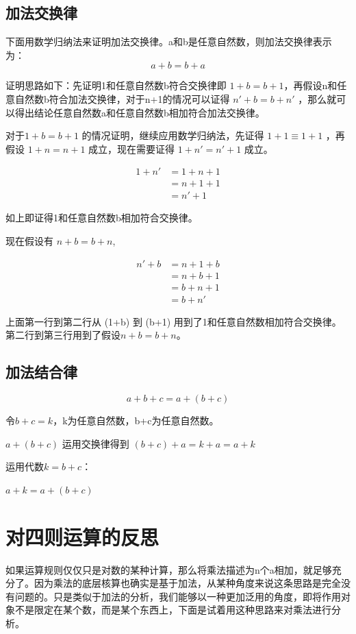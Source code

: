 \documentclass[12pt,oneside]{book}
\begin{document}
\subsection{加法交换律}
下面用数学归纳法来证明加法交换律。a和b是任意自然数，则加法交换律表示为：
\begin{equation}
a+b=b+a
\end{equation}

证明思路如下：先证明1和任意自然数b符合交换律即 $1+b = b+1$，再假设n和任意自然数b符合加法交换律，对于n+1的情况可以证得 $n'+b=b+n'$ ，那么就可以得出结论任意自然数a和任意自然数b相加符合加法交换律。

对于$1+b=b+1$ 的情况证明，继续应用数学归纳法，先证得 $1+1\equiv 1+1$ ，再假设 $1+n=n+1$ 成立，现在需要证得 $1+n'=n'+1$ 成立。

\begin{align}
1+n' &= 1+n+1\\
        &= n+1+1 \\
        &=n'+1
\end{align}

如上即证得1和任意自然数b相加符合交换律。

现在假设有 $n+b=b+n$,

\begin{align}
n'+b &=n+1+b\\
        &=n+b+1\\
        &=b+n+1\\
        &=b+n'
\end{align}

上面第一行到第二行从 (1+b) 到 (b+1) 用到了1和任意自然数相加符合交换律。第二行到第三行用到了假设$n+b=b+n$。

\subsection{加法结合律}
\begin{equation}
a + b + c = a + (b + c)
\end{equation}

令$b+c=k$，k为任意自然数，b+c为任意自然数。

$a+ (b + c)$ 运用交换律得到 $(b+c) +a = k+a = a+k$

运用代数$k=b+c$：

$a+k = a+ (b+c)$


\section{对四则运算的反思}
如果运算规则仅仅只是对数的某种计算，那么将乘法描述为n个a相加，就足够充分了。因为乘法的底层核算也确实是基于加法，从某种角度来说这条思路是完全没有问题的。只是类似于加法的分析，我们能够以一种更加泛用的角度，即将作用对象不是限定在某个数，而是某个东西上，下面是试着用这种思路来对乘法进行分析。
\end{document}
